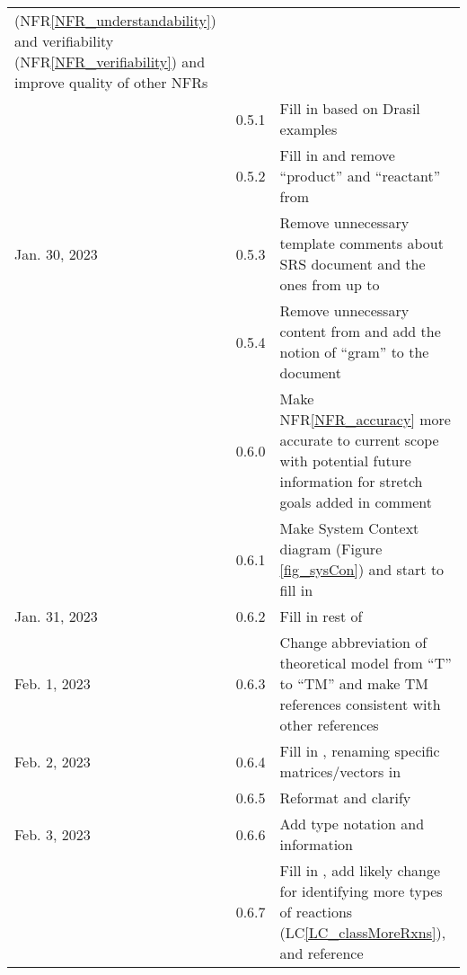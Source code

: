 \documentclass[12pt]{article}
\newcommand{\nfrref}[1]{NFR\ref{#1}}
\newcommand{\lcref}[1]{LC\ref{#1}}
\begin{document}
\begin{xltabular}{\textwidth}{llX}
  (\nfrref{NFR_understandability}) and verifiability
  (\nfrref{NFR_verifiability}) and improve quality of other NFRs                                             \\
  & 0.5.1         & Fill in  based on Drasil examples                 \\
  & 0.5.2         & Fill in  and remove ``product'' and
  ``reactant'' from                                                                   \\
  Jan. 30, 2023       & 0.5.3         & Remove unnecessary template comments about SRS document
  and the ones from  up to                                    \\
  & 0.5.4         & Remove unnecessary content from  and
  add the notion of ``gram'' to the document                                                                 \\
  & 0.6.0         & Make \nfrref{NFR_accuracy} more accurate to current scope with
  potential future information for stretch goals added in comment                                            \\
  & 0.6.1         & Make System Context diagram (Figure \ref{fig_sysCon}) and start
  to fill in                                                                             \\
  Jan. 31, 2023       & 0.6.2         & Fill in rest of                              \\
  Feb. 1, 2023        & 0.6.3         & Change abbreviation of theoretical model from ``T'' to
  ``TM'' and make TM references consistent with other references                                             \\
  Feb. 2, 2023        & 0.6.4         & Fill in , renaming specific matrices/vectors
  in                                                                                   \\
  & 0.6.5         & Reformat and clarify                                \\
  Feb. 3, 2023        & 0.6.6         & Add type notation and information                                    \\
  & 0.6.7         & Fill in , add
  likely change for identifying
  more types of reactions (\lcref{LC_classMoreRxns}), and reference

\end{xltabular}
\end{document}
